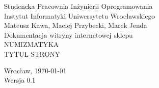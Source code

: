 \documentclass [11pt, a4paper, leqno]	{article}	%
\begin{document}

\begin{center}
	\thispagestyle{empty} 							%
	{\large Studencka Pracownia Inżynierii Oprogramowania} 		\\ [0.5cm]
	{\large Instytut Informatyki Uniwersytetu Wrocławskiego} 	\\ [6.0cm]

	{\large Mateusz Kawa, Maciej Przybecki, Marek Jenda} 		\\ [1.5cm]

	{\huge Dokumentacja witryny internetowej sklepu} 			\\ [0.5cm]
	{\huge NUMIZMATYKA} 										\\ [1.5cm]

	{\large TYTUL STRONY} 									\\ [0.5cm]

	\vfill
	
	{\large Wrocław, \today}									\\ [0.5cm]
	{\large Wersja 0.1}
\end{center}
\end{document}
